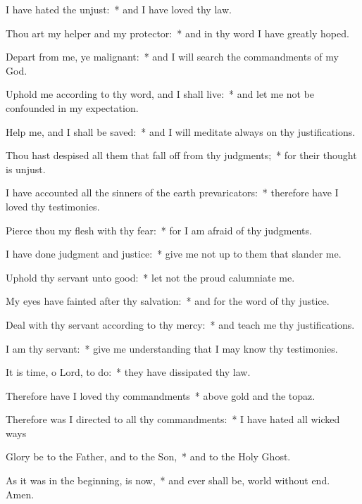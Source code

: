 \begin{enpars}
\item I have hated the unjust:~* and I have loved thy law.
\item Thou art my helper and my protector:~* and in thy word I have greatly hoped.
\item Depart from me, ye malignant:~* and I will search the commandments of my God.
\item Uphold me according to thy word, and I shall live:~* and let me not be confounded in my expectation.
\item Help me, and I shall be saved:~* and I will meditate always on thy justifications.
\item Thou hast despised all them that fall off from thy judgments;~* for their thought is unjust.
\item I have accounted all the sinners of the earth prevaricators:~* therefore have I loved thy testimonies.
\item Pierce thou my flesh with thy fear:~* for I am afraid of thy judgments.
\item I have done judgment and justice:~* give me not up to them that slander me.
\item Uphold thy servant unto good:~* let not the proud calumniate me.
\item My eyes have fainted after thy salvation:~* and for the word of thy justice.
\item Deal with thy servant according to thy mercy:~* and teach me thy justifications.
\item I am thy servant:~* give me understanding that I may know thy testimonies.
\item It is time, o Lord, to do:~* they have dissipated thy law.
\item Therefore have I loved thy commandments~* above gold and the topaz.
\item Therefore was I directed to all thy commandments:~* I have hated all wicked ways
\item Glory be to the Father, and to the Son,~* and to the Holy Ghost.
\item As it was in the beginning, is now,~* and ever shall be, world without end. Amen.
\end{enpars}